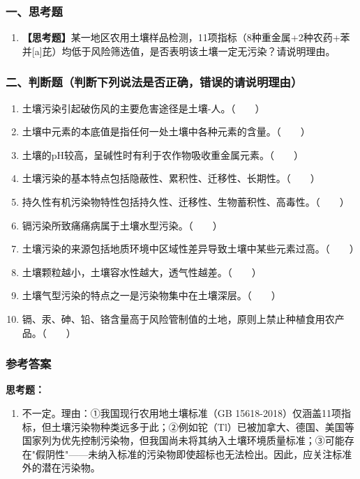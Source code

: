 \subsubsection*{一、思考题}

\begin{enumerate}[leftmargin=*, itemsep=8pt]
    \item \textbf{【思考题】}某一地区农用土壤样品检测，11项指标（8种重金属+2种农药+苯并[a]芘）均低于风险筛选值，是否表明该土壤一定无污染？请说明理由。
\end{enumerate}

\subsubsection*{二、判断题（判断下列说法是否正确，错误的请说明理由）}

\begin{enumerate}[leftmargin=*, itemsep=8pt]
    \item 土壤污染引起破伤风的主要危害途径是土壤-人。（~~~~）
    \item 土壤中元素的本底值是指任何一处土壤中各种元素的含量。（~~~~）
    \item 土壤的pH较高，呈碱性时有利于农作物吸收重金属元素。（~~~~）
    \item 土壤污染的基本特点包括隐蔽性、累积性、迁移性、长期性。（~~~~）
    \item 持久性有机污染物特性包括持久性、迁移性、生物蓄积性、高毒性。（~~~~）
    \item 镉污染所致痛痛病属于土壤水型污染。（~~~~）
    \item 土壤污染的来源包括地质环境中区域性差异导致土壤中某些元素过高。（~~~~）
    \item 土壤颗粒越小，土壤容水性越大，透气性越差。（~~~~）
    \item 土壤气型污染的特点之一是污染物集中在土壤深层。（~~~~）
    \item 镉、汞、砷、铅、铬含量高于风险管制值的土地，原则上禁止种植食用农产品。（~~~~）
\end{enumerate}

\subsubsection*{参考答案}

\textbf{思考题：}
\begin{enumerate}[leftmargin=*, itemsep=5pt]
    \item 不一定。理由：①我国现行农用地土壤标准（GB 15618-2018）仅涵盖11项指标，但土壤污染物种类远多于此；②例如铊（Tl）已被加拿大、德国、美国等国家列为优先控制污染物，但我国尚未将其纳入土壤环境质量标准；③可能存在"假阴性"——未纳入标准的污染物即使超标也无法检出。因此，应关注标准外的潜在污染物。
\end{enumerate}

